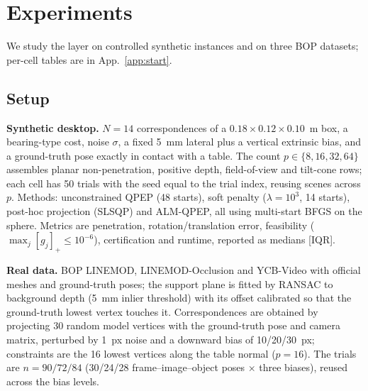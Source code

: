 \section{Experiments}\label{sec:experiments}
We study the layer on controlled synthetic instances and on three BOP datasets; per-cell tables are in App.~\ref{app:start}.

\subsection{Setup}\label{sec:setup}
\textbf{Synthetic desktop.} $N=14$ correspondences of a $0.18\times0.12\times0.10$~m box, a bearing-type cost, noise $\sigma$, a fixed 5~mm lateral plus a vertical extrinsic bias, and a ground-truth pose exactly in contact with a table. The count $p\in\{8,16,32,64\}$ assembles planar non-penetration, positive depth, field-of-view and tilt-cone rows; each cell has 50 trials with the seed equal to the trial index, reusing scenes across $p$. Methods: unconstrained QPEP (48 starts), soft penalty ($\lambda=10^3$, 14 starts), post-hoc projection (SLSQP) and ALM-QPEP, all using multi-start BFGS on the sphere. Metrics are penetration, rotation/translation error, feasibility ($\max_j[g_j]_+\le10^{-6}$), certification and runtime, reported as medians [IQR].

\textbf{Real data.} BOP LINEMOD, LINEMOD-Occlusion and YCB-Video with official meshes and ground-truth poses; the support plane is fitted by RANSAC to background depth (5~mm inlier threshold) with its offset calibrated so that the ground-truth lowest vertex touches it. Correspondences are obtained by projecting 30 random model vertices with the ground-truth pose and camera matrix, perturbed by 1~px noise and a downward bias of 10/20/30~px; constraints are the 16 lowest vertices along the table normal ($p=16$). The trials are $n=90/72/84$ (30/24/28 frame--image--object poses $\times$ three biases), reused across the bias levels.

